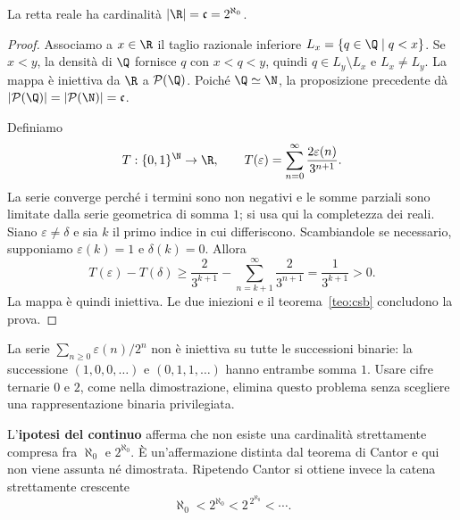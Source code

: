 \begin{teorema}\label{teo:continuo}
La retta reale ha cardinalità $|\R|=\mathfrak c=2^{\aleph_0}$.
\end{teorema}
\begin{proof}
 Associamo a $x\in\R$ il taglio razionale inferiore $L_x=\{q\in\Q\mid q<x\}$. Se $x<y$, la densità di $\Q$ fornisce $q$ con $x<q<y$, quindi $q\in L_y\setminus L_x$ e $L_x\ne L_y$. La mappa è iniettiva da $\R$ a $\mathcal P(\Q)$. Poiché $\Q\simeq\N$, la proposizione precedente dà $|\mathcal P(\Q)|=|\mathcal P(\N)|=\mathfrak c$.

 Definiamo
\[
T:\{0,1\}^{\N}\to\R,\qquad
T(\varepsilon)=\sum_{n=0}^{\infty}\frac{2\varepsilon(n)}{3^{n+1}}.
\]
La serie converge perché i termini sono non negativi e le somme parziali sono limitate dalla serie geometrica di somma $1$; si usa qui la completezza dei reali. Siano $\varepsilon\ne\delta$ e sia $k$ il primo indice in cui differiscono. Scambiandole se necessario, supponiamo $\varepsilon(k)=1$ e $\delta(k)=0$. Allora
\[
T(\varepsilon)-T(\delta)
\ge\frac{2}{3^{k+1}}-\sum_{n=k+1}^{\infty}\frac{2}{3^{n+1}}
=\frac{1}{3^{k+1}}>0.
\]
La mappa è quindi iniettiva. Le due iniezioni e il teorema~\ref{teo:csb} concludono la prova.
\end{proof}

\begin{osservazione}
La serie $\sum_{n\ge0}\varepsilon(n)/2^n$ non è iniettiva su tutte le successioni binarie: la successione $(1,0,0,\ldots)$ e $(0,1,1,\ldots)$ hanno entrambe somma $1$. Usare cifre ternarie $0$ e $2$, come nella dimostrazione, elimina questo problema senza scegliere una rappresentazione binaria privilegiata.
\end{osservazione}

\begin{osservazione}
L'\textbf{ipotesi del continuo} afferma che non esiste una cardinalità strettamente compresa fra $\aleph_0$ e $2^{\aleph_0}$. È un'affermazione distinta dal teorema di Cantor e qui non viene assunta né dimostrata. Ripetendo Cantor si ottiene invece la catena strettamente crescente
\[
\aleph_0<2^{\aleph_0}<2^{\,2^{\aleph_0}}<\cdots.
\]
\end{osservazione}

